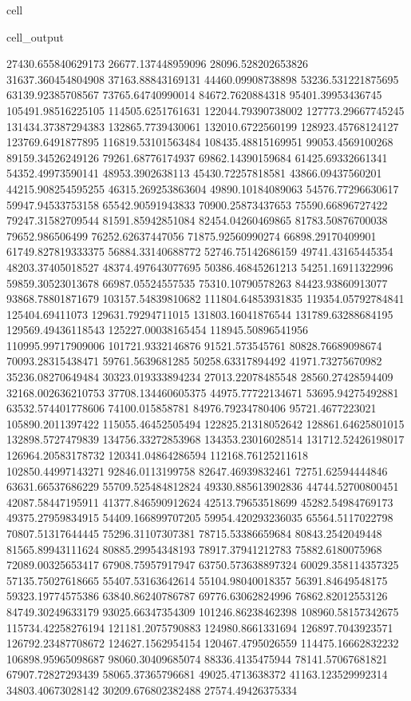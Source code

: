 \documentclass[letterpaper,10pt,english]{jupyterBook}
\begin{document}
\begin{sphinxuseclass}{cell}
\begin{sphinxVerbatimOutput}
\begin{sphinxuseclass}{cell_output}
\begin{sphinxVerbatim}[commandchars=\\\{\}]
27430.655840629173  26677.137448959096  28096.528202653826  31637.360454804908  37163.88843169131  44460.09908738898  53236.531221875695  63139.92385708567  73765.64740990014  84672.7620884318  95401.39953436745  105491.98516225105  114505.6251761631  122044.79390738002  127773.29667745245  131434.37387294383  132865.7739430061  132010.6722560199  128923.45768124127  123769.6491877895  116819.53101563484  108435.48815169951  99053.4569100268  89159.34526249126  79261.68776174937  69862.14390159684  61425.69332661341  54352.49973590141  48953.3902638113  45430.72257818581  43866.09437560201  44215.908254595255  46315.269253863604  49890.10184089063  54576.77296630617  59947.94533753158  65542.90591943833  70900.25873437653  75590.66896727422  79247.31582709544  81591.85942851084  82454.04260469865  81783.50876700038  79652.986506499  76252.62637447056  71875.92560990274  66898.29170409901  61749.827819333375  56884.33140688772  52746.75142686159  49741.43165445354  48203.37405018527  48374.497643077695  50386.46845261213  54251.16911322996  59859.30523013678  66987.05524557535  75310.10790578263  84423.93860913077  93868.78801871679  103157.54839810682  111804.64853931835  119354.05792784841  125404.69411073  129631.79294711015  131803.16041876544  131789.63288684195  129569.49436118543  125227.00038165454  118945.50896541956  110995.99717909006  101721.9332146876  91521.573545761  80828.76689098674  70093.28315438471  59761.5639681285  50258.63317894492  41971.73275670982  35236.08270649484  30323.019333894234  
27013.22078485548  28560.27428594409  32168.002636210753  37708.134460605375  44975.77722134671  53695.94275492881  63532.574401778606  74100.015858781  84976.79234780406  95721.4677223021  105890.2011397422  115055.46452505494  122825.21318052642  128861.64625801015  132898.5727479839  134756.33272853968  134353.23016028514  131712.52426198017  126964.20583178732  120341.04864286594  112168.76125211618  102850.44997143271  92846.0113199758  82647.46939832461  72751.62594444846  63631.66537686229  55709.525484812824  49330.885613902836  44744.52700800451  42087.58447195911  41377.846590912624  42513.79653518699  45282.54984769173  49375.27959834915  54409.166899707205  59954.420293236035  65564.5117022798  70807.51317644445  75296.31107307381  78715.53386659684  80843.2542049448  81565.89943111624  80885.29954348193  78917.37941212783  75882.6180075968  72089.00325653417  67908.75957917947  63750.573638897324  60029.358114357325  57135.75027618665  55407.53163642614  55104.98040018357  56391.84649548175  59323.19774575386  63840.86240786787  69776.63062824996  76862.82012553126  84749.30249633179  93025.66347354309  101246.86238462398  108960.58157342675  115734.42258276194  121181.2075790883  124980.8661331694  126897.7043923571  126792.23487708672  124627.1562954154  120467.4795026559  114475.16662832232  106898.95965098687  98060.30409685074  88336.4135475944  78141.57067681821  67907.72827293439  58065.37365796681  49025.4713638372  41163.123529992314  34803.40673028142  30209.676802382488  27574.49426375334  

\end{sphinxVerbatim}
\end{sphinxuseclass}
\end{sphinxVerbatimOutput}
\end{sphinxuseclass}
\end{document}

